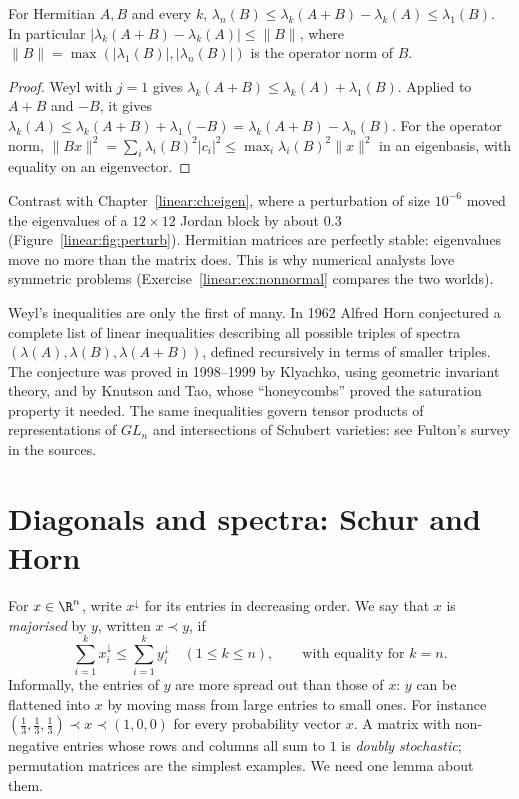 \begin{corollary}\label{linear:cor:weylpert}
For Hermitian $A,B$ and every $k$, $\lambda_n(B)\le\lambda_k(A+B)-\lambda_k(A)\le\lambda_1(B)$. In particular
$|\lambda_k(A+B)-\lambda_k(A)|\le\|B\|$, where $\|B\|=\max(|\lambda_1(B)|,|\lambda_n(B)|)$ is the operator norm of $B$.
\end{corollary}
\begin{proof}
Weyl with $j=1$ gives $\lambda_k(A+B)\le\lambda_k(A)+\lambda_1(B)$. Applied to $A+B$ and $-B$, it gives $\lambda_k(A)\le
\lambda_k(A+B)+\lambda_1(-B)=\lambda_k(A+B)-\lambda_n(B)$. For the operator norm, $\|Bx\|^2=\sum_i\lambda_i(B)^2|c_i|^2\le
\max_i\lambda_i(B)^2\|x\|^2$ in an eigenbasis, with equality on an eigenvector.
\end{proof}

Contrast with Chapter~\ref{linear:ch:eigen}, where a perturbation of size $10^{-6}$ moved the eigenvalues of a $12\times12$ Jordan
block by about $0.3$ (Figure~\ref{linear:fig:perturb}). Hermitian matrices are perfectly stable: eigenvalues move no more than the matrix does.
This is why numerical analysts love symmetric problems (Exercise~\ref{linear:ex:nonnormal} compares the two worlds).

\begin{remark}
Weyl's inequalities are only the first of many. In 1962 Alfred Horn conjectured a complete list of linear inequalities
describing all possible triples of spectra $(\lambda(A),\lambda(B),\lambda(A+B))$, defined recursively in terms of smaller
triples. The conjecture was proved in 1998--1999 by Klyachko, using geometric invariant theory, and by Knutson and Tao,
whose ``honeycombs'' proved the saturation property it needed. The same inequalities govern tensor products of
representations of $GL_n$ and intersections of Schubert varieties: see Fulton's survey in the sources.
\end{remark}

\section{Diagonals and spectra: Schur and Horn}\label{linear:sec:schurhorn}

For $x\in\R^n$, write $x^\downarrow$ for its entries in decreasing order. We say that $x$ is \emph{majorised} by $y$, written
$x\prec y$, if
\[
\sum_{i=1}^kx^\downarrow_i\le\sum_{i=1}^ky^\downarrow_i\quad(1\le k\le n),\qquad\text{with equality for }k=n.
\]
Informally, the entries of $y$ are more spread out than those of $x$: $y$ can be flattened into $x$ by moving mass from
large entries to small ones. For instance $(\frac13,\frac13,\frac13)\prec x\prec(1,0,0)$ for every probability vector $x$. A matrix with
non-negative entries whose rows and columns all sum to $1$ is \emph{doubly stochastic}; permutation matrices are the
simplest examples. We need one lemma about them.

